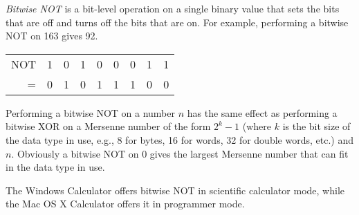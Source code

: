 \documentclass[12pt]{article}
\begin{document}
{\em Bitwise NOT} is a bit-level operation on a single binary value that sets the bits that are off and turns off the bits that are on. For example, performing a bitwise NOT on 163 gives 92.

\begin{tabular}{|r|c|c|c|c|c|c|c|c|}
NOT & 1 & 0 & 1 & 0 & 0 & 0 & 1 & 1 \\
  = & 0 & 1 & 0 & 1 & 1 & 1 & 0 & 0 \\
\end{tabular}

Performing a bitwise NOT on a number $n$ has the same effect as performing a bitwise XOR on a Mersenne number of the form $2^k - 1$ (where $k$ is the bit size of the data type in use, e.g., 8 for bytes, 16 for words, 32 for double words, etc.) and $n$. Obviously a bitwise NOT on 0 gives the largest Mersenne number that can fit in the data type in use.

The Windows Calculator offers bitwise NOT in scientific calculator mode, while the Mac OS X Calculator offers it in programmer mode.
\end{document}
